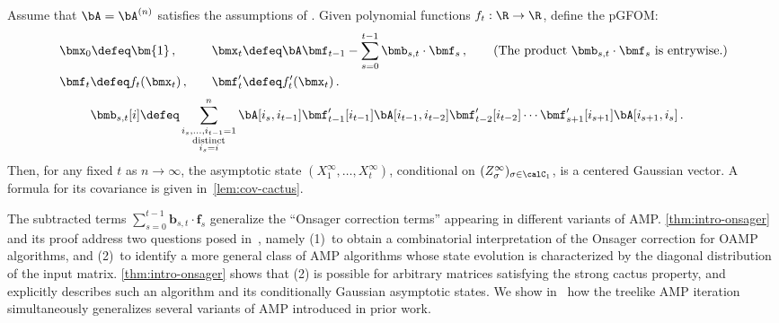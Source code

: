 \begin{theorem}
\label{thm:intro-onsager}
    Assume that $\bA = \bA^{(n)}$ satisfies the assumptions of .
    Given polynomial functions $f_t : \R \to \R$, define the pGFOM:
    \begin{equation*}
    \begin{alignedat}{2}
        &\bmx_0 \defeq \bm{1}\,, \qquad
        &&\bmx_t \defeq \bA \bmf_{t-1}
          - \sum_{s=0}^{t-1}\bmb_{s,t} \cdot \bmf_s \,,
          \qquad
          \text{(The product $\bmb_{s,t} \cdot \bmf_s$ is entrywise.)}
        \\
        &\bmf_t \defeq f_t(\bmx_t)\,, \qquad
        &&\bmf'_t \defeq f'_t(\bmx_t)\,.
    \end{alignedat}
    \end{equation*}
    \begin{equation*}
    \begin{aligned}
        \bmb_{s,t}[i]
        &\defeq
        \sum_{\substack{
            i_s,\dots,i_{t-1}=1\\
            \textnormal{distinct}\\
            i_s=i
        }}^n
        \bA[i_s,i_{t-1}] \bmf'_{t-1}[i_{t-1}]
        \bA[i_{t-1},i_{t-2}] \bmf'_{t-2}[i_{t-2}]
        \cdots
        \bmf'_{s+1}[i_{s+1}]
        \bA[i_{s+1},i_s]\,.
    \end{aligned}
    \end{equation*}
    Then, for any fixed $t$ as $n \to \infty$, the asymptotic state $(X^\infty_1,\ldots,X^\infty_t)$, conditional on $(Z_{\sigma}^{\infty})_{\sigma\in\calC_1}$, is a centered Gaussian vector.
    A formula for its covariance is given in~\cref{lem:cov-cactus}.
\end{theorem}

The subtracted terms $\sum_{s=0}^{t-1} \bm b_{s,t} \cdot \bm f_s$ generalize the ``Onsager correction terms'' appearing in different variants of AMP.
\cref{thm:intro-onsager} and its proof address two questions posed in~\cite{wang2022universality},
namely (1)~to obtain a combinatorial interpretation of the Onsager correction for OAMP algorithms,
and (2)~to identify a more general class of AMP algorithms whose state evolution is characterized by the diagonal distribution of the input matrix.
\cref{thm:intro-onsager} shows that (2) is possible for arbitrary matrices satisfying the strong cactus property, and explicitly describes such an algorithm and its conditionally Gaussian asymptotic states. We
show in~ how the treelike
AMP iteration simultaneously generalizes several
variants of AMP introduced in prior work.

